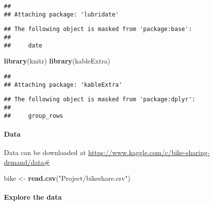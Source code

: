 \documentclass[]{article}
\newenvironment{Shaded}{\begin{snugshade}}{\end{snugshade}}
\newcommand{\KeywordTok}[1]{\textcolor[rgb]{0.13,0.29,0.53}{\textbf{#1}}}
\newcommand{\StringTok}[1]{\textcolor[rgb]{0.31,0.60,0.02}{#1}}
\newcommand{\OperatorTok}[1]{\textcolor[rgb]{0.81,0.36,0.00}{\textbf{#1}}}
\newcommand{\NormalTok}[1]{#1}
\let\oldparagraph\paragraph
\renewcommand{\paragraph}[1]{\oldparagraph{#1}\mbox{}}
\begin{document}
\begin{verbatim}
## 
## Attaching package: 'lubridate'
\end{verbatim}

\begin{verbatim}
## The following object is masked from 'package:base':
## 
##     date
\end{verbatim}

\begin{Shaded}
\begin{Highlighting}[]
\KeywordTok{library}\NormalTok{(knitr)}
\KeywordTok{library}\NormalTok{(kableExtra)}
\end{Highlighting}
\end{Shaded}

\begin{verbatim}
## 
## Attaching package: 'kableExtra'
\end{verbatim}

\begin{verbatim}
## The following object is masked from 'package:dplyr':
## 
##     group_rows
\end{verbatim}

\paragraph{Data}\label{data}

Data can be downloaded at
\url{https://www.kaggle.com/c/bike-sharing-demand/data\#}

\begin{Shaded}
\begin{Highlighting}[]
\NormalTok{bike <-}\StringTok{  }\KeywordTok{read.csv}\NormalTok{(}\StringTok{"Project/bikeshare.csv"}\NormalTok{)}
\end{Highlighting}
\end{Shaded}

\paragraph{Explore the data}\label{explore-the-data}

\begin{Shaded}
\end{Shaded}
\end{document}
